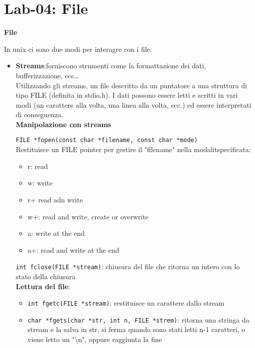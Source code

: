 \section{Lab-04: File}
\begin{flushleft}
  \textbf{File}\par 
  In unix ci sono due modi per interagre con i file:
  \begin{itemize}
    \subsection{Streams}
    \item \textbf{Streams}:forniscono strumenti come la formattazione dei dati, bufferizzazione, ecc… \\
          Utilizzando gli streams, un file \ace descritto da un puntatore a una struttura di tipo 
          FILE (definita in stdio.h). I dati possono essere letti e scritti in vari modi (un 
          carattere alla volta, una linea alla volta, ecc.) ed essere interpretati di conseguenza. \\
          \textbf{Manipolazione con streams} \par 
          \texttt{FILE *fopen(const char *filename, const char *mode)} \\
          Restituisce un FILE pointer per gestire il "filename" nella modalit\aca specificata:
          \begin{itemize}
            \item r: read
            \item w: write
            \item r+ read adn write 
            \item w+: read and write, create or overwrite
            \item a: write at the end
            \item a+: read and write at the end
          \end{itemize}
          \texttt{int fclose(FILE *stream)}: chiusura del file che ritorna un intero con lo stato della chiusura \\
          \textbf{Lettura del file}:
          \begin{itemize}
            \item \texttt{int fgetc(FILE *stream)}: restituisce un carattere dallo stream
            \item \texttt{char *fgets(char *str, int n, FILE *strem)}: ritorna una stringa da stream e la salva in 
                    str, si ferma quando sono stati letti n-1 caratteri, o viene letto un "\textbackslash n", oppure raggiunta la fine\\

\end{itemize}
\end{itemize}
\end{flushleft}
